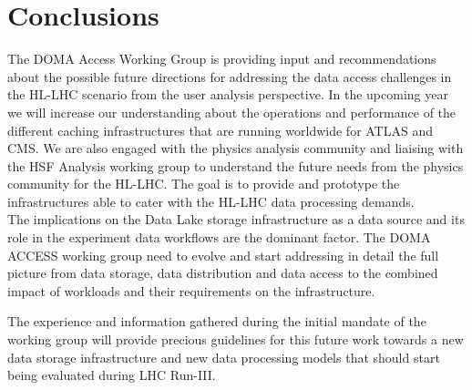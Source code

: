 \section{Conclusions}
The DOMA Access Working Group is providing input and recommendations about the possible future directions for addressing the data access challenges in the HL-LHC scenario from the user analysis perspective. In the upcoming year we will increase our understanding about the operations and performance of the different caching infrastructures that are running worldwide for ATLAS and CMS. We are also engaged with the physics analysis community and liaising with the HSF Analysis working group to understand the future needs from the physics community for the HL-LHC. The goal is to provide and prototype the infrastructures able to cater with the HL-LHC data processing demands.\\

The implications on the Data Lake storage infrastructure as a data source and its role in the experiment data workflows are the dominant factor. The DOMA ACCESS working group need to evolve and start addressing in detail the full picture from data storage, data distribution and data access to the combined impact of workloads and their requirements on the infrastructure.

 The experience and information gathered during the initial mandate of the working group will provide precious guidelines for this future work towards a new data storage infrastructure and new data processing models that should start being evaluated during LHC Run-III.
